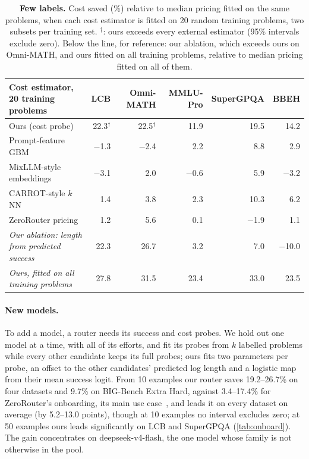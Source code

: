 \documentclass[10pt]{article}
\begin{document}
\begin{table}[t]
\centering
\footnotesize
\setlength{\tabcolsep}{4pt}
\begin{tabular}{lrrrrr}
\toprule
Cost estimator, 20 training problems & LCB & Omni-MATH & MMLU-Pro & SuperGPQA & BBEH \\
\midrule
Ours (cost probe) & 22.3$^\dagger$ & 22.5$^\dagger$ & 11.9 & 19.5 & 14.2 \\
\midrule
Prompt-feature GBM & $-$1.3 & $-$2.4 & 2.2 & 8.8 & 2.9 \\
MixLLM-style embeddings & $-$3.1 & 2.0 & $-$0.6 & 5.9 & $-$3.2 \\
CARROT-style $k$NN & 1.4 & 3.8 & 2.3 & 10.3 & 6.2 \\
ZeroRouter pricing & 1.2 & 5.6 & 0.1 & $-$1.9 & 1.1 \\
\midrule
\emph{Our ablation: length from predicted success} & 22.3 & 26.7 & 3.2 & 7.0 & $-$10.0 \\
\emph{Ours, fitted on all training problems} & 27.8 & 31.5 & 23.4 & 33.0 & 23.5 \\
\bottomrule
\end{tabular}
\caption{\textbf{Few labels.} Cost saved (\%) relative to median pricing fitted on the same problems, when each cost estimator is fitted on 20 random training problems, two subsets per training set. $^\dagger$: ours exceeds every external estimator (95\% intervals exclude zero). Below the line, for reference: our ablation, which exceeds ours on Omni-MATH, and ours fitted on all training problems, relative to median pricing fitted on all of them.}
\label{tab:labels}
\end{table}

\paragraph{New models.}
To add a model, a router needs its success and cost probes. We hold out one model at a time, with all of its efforts, and fit its probes from $k$ labelled problems while every other candidate keeps its full probes; ours fits two parameters per probe, an offset to the other candidates' predicted log length and a logistic map from their mean success logit. From 10 examples our router saves 19.2--26.7\% on four datasets and 9.7\% on BIG-Bench Extra Hard, against 3.4--17.4\% for ZeroRouter's onboarding, its main use case~\citep{zerorouter}, and leads it on every dataset on average (by 5.2--13.0 points), though at 10 examples no interval excludes zero; at 50 examples ours leads significantly on LCB and SuperGPQA (\cref{tab:onboard}). The gain concentrates on deepseek-v4-flash, the one model whose family is not otherwise in the pool.
\end{document}
